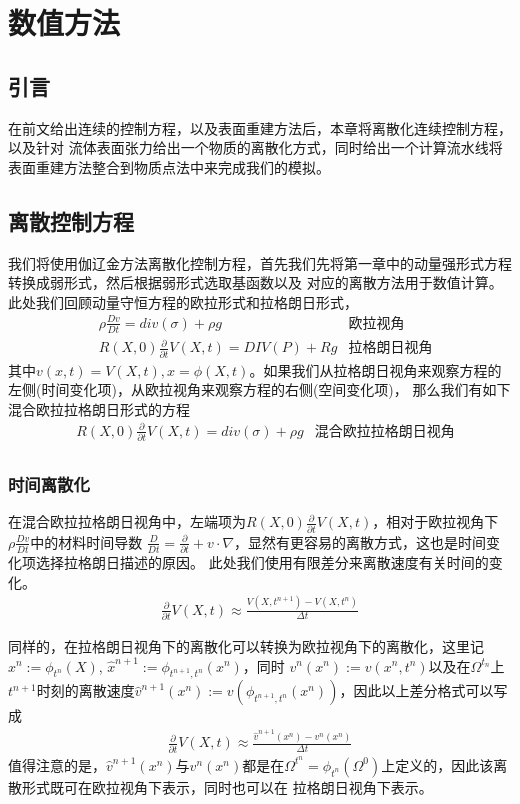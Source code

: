 \chapter{数值方法} \label{chap4}
\section{引言}
在前文给出连续的控制方程，以及表面重建方法后，本章将离散化连续控制方程，以及针对
流体表面张力给出一个物质的离散化方式，同时给出一个计算流水线将表面重建方法整合到物质点法中来完成我们的模拟。
\section{离散控制方程}
我们将使用伽辽金方法离散化控制方程，首先我们先将第一章中的动量强形式方程转换成弱形式，然后根据弱形式选取基函数以及
对应的离散方法用于数值计算。此处我们回顾动量守恒方程的欧拉形式和拉格朗日形式，
\begin{align*}    
    &\rho \frac{Dv}{Dt} = div(\sigma) + \rho g & \text{欧拉视角}\\
    &R(X,0)\frac{\partial}{\partial t} V(X,t) = DIV(P) + Rg &\text{拉格朗日视角}
\end{align*}
其中$v(x,t) = V(X,t), x = \phi(X,t)$。如果我们从拉格朗日视角来观察方程的左侧(时间变化项)，从欧拉视角来观察方程的右侧(空间变化项)，
那么我们有如下混合欧拉拉格朗日形式的方程
\begin{align*}
    &R(X,0)\frac{\partial}{\partial t} V(X,t) = div(\sigma) + \rho g & \text{混合欧拉拉格朗日视角}\\ 
\end{align*}
\subsection{时间离散化}
在混合欧拉拉格朗日视角中，左端项为$R(X,0)\frac{\partial}{\partial t}V(X,t)$，相对于欧拉视角下$\rho \frac{Dv}{Dt}$中的材料时间导数
$\frac{D}{Dt} = \frac{\partial}{\partial t} + v\cdot \nabla$，显然有更容易的离散方式，这也是时间变化项选择拉格朗日描述的原因。
此处我们使用有限差分来离散速度有关时间的变化。
\begin{align*}
    \frac{\partial}{\partial t} V(X,t) \approx \frac{V(X,t^{n+1}) - V(X,t^n)}{\Delta t}
\end{align*}

同样的，在拉格朗日视角下的离散化可以转换为欧拉视角下的离散化，这里记$x^{n} := \phi_{t^n}(X)$, $\hat{x}^{n+1} := \phi_{t^{n+1},t^n}(x^n)$，同时
$v^n(x^n) := v(x^n,t^n)$以及在$\Omega^{t_n}$上$t^{n+1}$时刻的离散速度$\hat{v}^{n+1}(x^n) := v(\phi_{t^{n+1},t^n}(x^n))$，因此以上差分格式可以写成
\begin{align*}
    \frac{\partial}{\partial t} V(X,t) \approx \frac{\hat{v}^{n+1}(x^n) - v^n(x^n)}{\Delta t}
\end{align*}
值得注意的是，$\hat{v}^{n+1}(x^n)$与$v^n(x^n)$都是在$\Omega^{t^n} = \phi_{t^n}(\Omega^0)$上定义的，因此该离散形式既可在欧拉视角下表示，同时也可以在
拉格朗日视角下表示。
